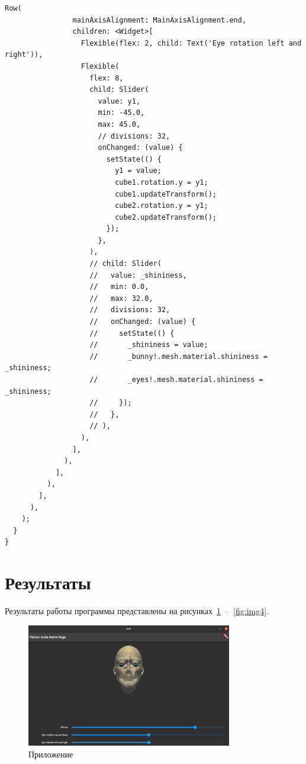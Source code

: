 \documentclass[a4paper, 14pt]{extarticle}
\begin{document}
\begin{lstlisting}[language={},caption={Работа с трехмерными объектами},label={lst:code1}]
              Row(
                mainAxisAlignment: MainAxisAlignment.end,
                children: <Widget>[
                  Flexible(flex: 2, child: Text('Eye rotation left and right')),
                  Flexible(
                    flex: 8,
                    child: Slider(
                      value: y1,
                      min: -45.0,
                      max: 45.0,
                      // divisions: 32,
                      onChanged: (value) {
                        setState(() {
                          y1 = value;
                          cube1.rotation.y = y1;
                          cube1.updateTransform();
                          cube2.rotation.y = y1;
                          cube2.updateTransform();
                        });
                      },
                    ),
                    // child: Slider(
                    //   value: _shininess,
                    //   min: 0.0,
                    //   max: 32.0,
                    //   divisions: 32,
                    //   onChanged: (value) {
                    //     setState(() {
                    //       _shininess = value;
                    //       _bunny!.mesh.material.shininess = _shininess;
                    //       _eyes!.mesh.material.shininess = _shininess;
                    //     });
                    //   },
                    // ),
                  ),
                ],
              ),
            ],
          ),
        ],
      ),
    );
  }
}

\end{lstlisting}

\section{Результаты}\label{Sect::res}

Результаты работы программы представлены на рисунках~\ref{fig:img1}~--~\ref{fig:img4}.  

\begin{figure}[!htb]
	\centering
	\includegraphics[width=0.8\textwidth]{img1}
\caption{Приложение}
\label{fig:img1}
\end{figure}
\end{document}
